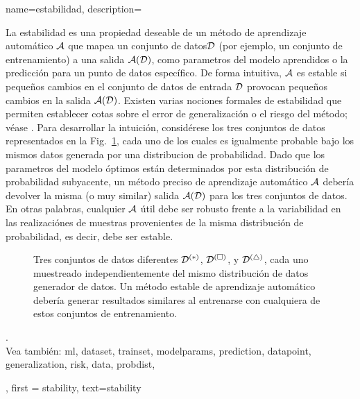 	 
{name={estabilidad},
	description={
		La estabilidad es una propiedad deseable de un método de aprendizaje automático $\mathcal{A}$ que mapea un 
		conjunto de datos$\mathcal{D}$ (por ejemplo, un conjunto de entrenamiento) a una salida $\mathcal{A}(\mathcal{D})$, como 
		parametros del modelo aprendidos o la predicción para un punto de datos específico. De forma intuitiva, 
		$\mathcal{A}$ es estable si pequeños cambios en el conjunto de datos de entrada $\mathcal{D}$ provocan pequeños 
		cambios en la salida $\mathcal{A}(\mathcal{D})$. Existen varias nociones formales de estabilidad que permiten 
		establecer cotas sobre el error de generalización o el riesgo del método; véase \cite[Cap.~13]{ShalevMLBook}.
		Para desarrollar la intuición, considérese los tres conjuntos de datos representados en la 
		Fig.~\ref{fig_three_data_stability}, cada uno de los cuales es igualmente probable bajo los mismos datos
		generada por una distribucion de probabilidad. Dado que los parametros del modelo óptimos están determinados por esta 
		distribución de probabilidad subyacente, un método preciso de aprendizaje automático $\mathcal{A}$ debería devolver la misma (o muy similar) 
		salida $\mathcal{A}(\mathcal{D})$ para los tres conjuntos de datos. En otras palabras, cualquier $\mathcal{A}$ útil debe ser 
		robusto frente a la variabilidad en las realizaciónes de muestras provenientes de la misma distribución de probabilidad, 
		es decir, debe ser estable. 
		\begin{figure}[H]
			\centering
			\caption{Tres conjuntos de datos diferentes $\mathcal{D}^{(*)}$, $\mathcal{D}^{(\square)}$, y $\mathcal{D}^{(\triangle)}$, 
				cada uno muestreado independientemente del mismo distribución de datos generador de datos. Un método estable de aprendizaje automático 
				debería generar resultados similares al entrenarse con cualquiera de estos conjuntos de entrenamiento. \label{fig_three_data_stability}}
		\end{figure}.
		\\
		Vea también: \gls{ml}, \gls{dataset}, \gls{trainset}, \glspl{modelparam}, \gls{prediction}, \gls{datapoint}, \gls{generalization}, \gls{risk}, \gls{data}, \gls{probdist},   }, 
	first = {stability}, text={stability} 
}

